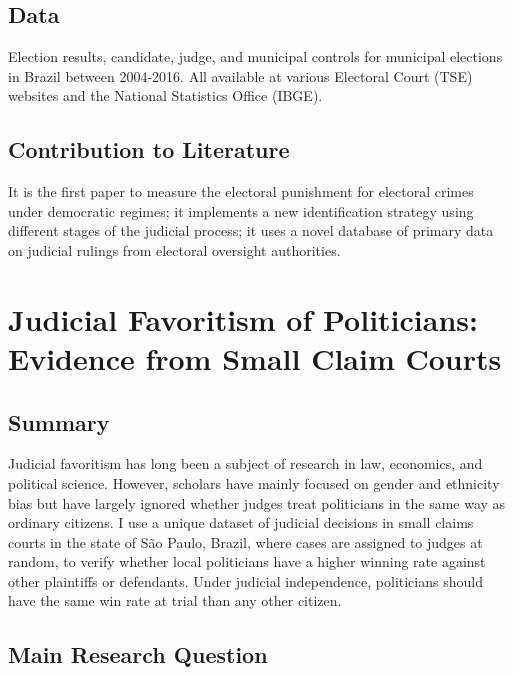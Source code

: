 \documentclass[]{article}
\begin{document}
\hypertarget{data}{%
\subsection{Data}\label{data}}

Election results, candidate, judge, and municipal controls for municipal
elections in Brazil between 2004-2016. All available at various
Electoral Court (TSE) websites and the National Statistics Office
(IBGE).

\hypertarget{contribution-to-literature}{%
\subsection{Contribution to
Literature}\label{contribution-to-literature}}

It is the first paper to measure the electoral punishment for electoral
crimes under democratic regimes; it implements a new identification
strategy using different stages of the judicial process; it uses a novel
database of primary data on judicial rulings from electoral oversight
authorities.

\hypertarget{title2}{%
\section{Judicial Favoritism of Politicians: Evidence from Small Claim
Courts}\label{title2}}

\hypertarget{summary-2}{%
\subsection{Summary}\label{summary-2}}

Judicial favoritism has long been a subject of research in law,
economics, and political science. However, scholars have mainly focused
on gender and ethnicity bias but have largely ignored whether judges
treat politicians in the same way as ordinary citizens. I use a unique
dataset of judicial decisions in small claims courts in the state of São
Paulo, Brazil, where cases are assigned to judges at random, to verify
whether local politicians have a higher winning rate against other
plaintiffs or defendants. Under judicial independence, politicians
should have the same win rate at trial than any other citizen.

\hypertarget{main-research-question-1}{%
\subsection{Main Research Question}\label{main-research-question-1}}
\end{document}
